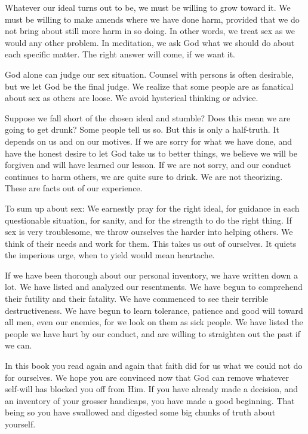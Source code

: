 \begin{biblechapter}
Whatever our ideal turns out to be, we must be willing to grow toward it.  We must be willing to make amends where we have done harm,  provided that we do not bring about still more harm in so doing.  In other words, we treat sex as we would any other problem.  In meditation, we ask God what we should do about each specific matter.  The right answer will come, if we want it.

God alone can judge our sex situation.  Counsel with persons is often desirable, but we let God be the final judge.  We realize that some people are as fanatical about sex as others are loose.  We avoid hysterical thinking or advice.

Suppose we fall short of the chosen ideal and stumble?  Does this mean we are going to get drunk?  Some people tell us so.  But this is only a half-truth.  It depends on us and on our motives.  If we are sorry for what we have done, and have the honest desire to let God take us to better things, we believe we will be forgiven and will have learned our lesson.  If we are not sorry, and our conduct continues to harm others, we are quite sure to drink.  We are not theorizing.  These are facts out of our experience.

To sum up about sex:  We earnestly pray for the right ideal, for guidance in each questionable situation, for sanity, and for the strength to do the right thing.  If sex is very troublesome, we throw ourselves the harder into helping others.  We think of their needs and work for them.  This takes us out of ourselves.  It quiets the imperious urge, when to yield would mean heartache.

If we have been thorough about our personal inventory, we have written down a lot.  We have listed and analyzed our resentments.  We have begun to comprehend their futility and their fatality.  We have commenced to see their terrible destructiveness.  We have begun to learn tolerance, patience and good will toward all men, even our enemies, for we look on them as sick people.  We have listed the people we have hurt by our conduct, and are willing to straighten out the past if we can.

In this book you read again and again that faith did for us what we could not do for ourselves.  We hope you are convinced now that God can remove whatever self-will has blocked you off from Him.  If you have already made a decision, and an inventory of your grosser handicaps, you have made a good beginning.  That being so you have swallowed and digested some big chunks of truth about yourself.

\end{biblechapter}

